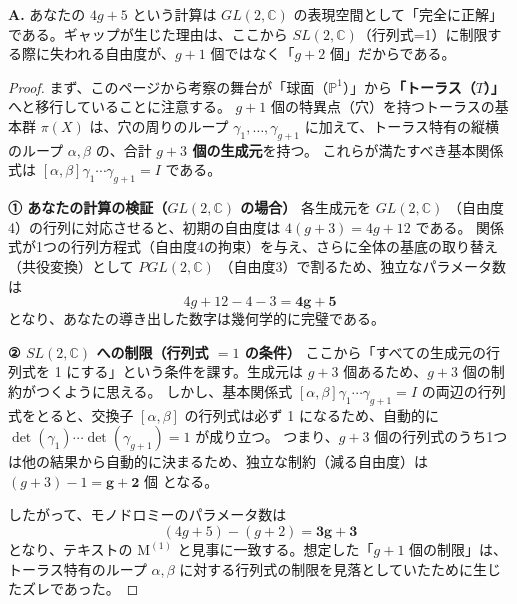 \begin{Q}[【核心】行列式の制約がなければパラメータは $4g+5$ 個になるという計算と、テキストの $M^{(1)} = 3g+3$ の間にある「次元のギャップ」の正体は何か？]
\textbf{A.} あなたの $4g+5$ という計算は $GL(2, \mathbb{C})$ の表現空間として「完全に正解」である。ギャップが生じた理由は、ここから $SL(2, \mathbb{C})$（行列式=1）に制限する際に失われる自由度が、$g+1$ 個ではなく「$g+2$ 個」だからである。

\begin{proof}
まず、このページから考察の舞台が「球面（$\mathbb{P}^1$）」から\textbf{「トーラス（$T$）」}へと移行していることに注意する。
$g+1$ 個の特異点（穴）を持つトーラスの基本群 $\pi(X)$ は、穴の周りのループ $\gamma_1, \dots, \gamma_{g+1}$ に加えて、トーラス特有の縦横のループ $\alpha, \beta$ の、合計 \textbf{$g+3$ 個の生成元}を持つ。
これらが満たすべき基本関係式は $[\alpha, \beta]\gamma_1 \cdots \gamma_{g+1} = I$ である。

\textbf{① あなたの計算の検証（$GL(2, \mathbb{C})$ の場合）}
各生成元を $GL(2, \mathbb{C})$ （自由度4）の行列に対応させると、初期の自由度は $4(g+3) = 4g+12$ である。
関係式が1つの行列方程式（自由度4の拘束）を与え、さらに全体の基底の取り替え（共役変換）として $PGL(2, \mathbb{C})$ （自由度3）で割るため、独立なパラメータ数は
\begin{equation*}
4g+12 - 4 - 3 = \mathbf{4g+5}
\end{equation*}
となり、あなたの導き出した数字は幾何学的に完璧である。

\textbf{② $SL(2, \mathbb{C})$ への制限（行列式 $= 1$ の条件）}
ここから「すべての生成元の行列式を 1 にする」という条件を課す。生成元は $g+3$ 個あるため、$g+3$ 個の制約がつくように思える。
しかし、基本関係式 $[\alpha, \beta]\gamma_1 \cdots \gamma_{g+1} = I$ の両辺の行列式をとると、交換子 $[\alpha, \beta]$ の行列式は必ず 1 になるため、自動的に $\det(\gamma_1) \cdots \det(\gamma_{g+1}) = 1$ が成り立つ。
つまり、$g+3$ 個の行列式のうち1つは他の結果から自動的に決まるため、独立な制約（減る自由度）は $(g+3) - 1 = \mathbf{g+2 \textbf{ 個}}$ となる。

したがって、モノドロミーのパラメータ数は
\begin{equation*}
(4g+5) - (g+2) = \mathbf{3g+3}
\end{equation*}
となり、テキストの $\mathrm{M}^{(1)}$ と見事に一致する。想定した「$g+1$ 個の制限」は、トーラス特有のループ $\alpha, \beta$ に対する行列式の制限を見落としていたために生じたズレであった。
\end{proof}
\end{Q}

